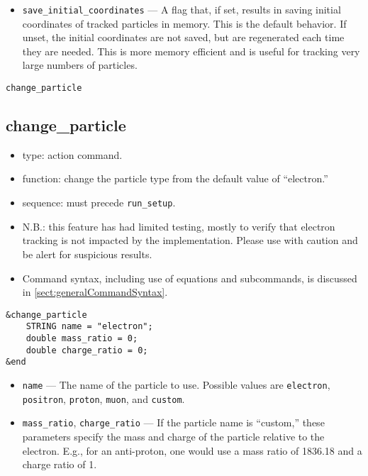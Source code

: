 \documentclass[11pt]{article}
\begin{document}
\begin{itemize}
\item \verb|save_initial_coordinates| --- A flag that, if set, results
in saving initial coordinates of tracked particles in memory.  This is
the default behavior.  If unset, the initial coordinates are not
saved, but are regenerated each time they are needed.  This is more
memory efficient and is useful for tracking very large numbers of
particles.
\end{itemize}

\newpage
\begin{center}{\Large\verb|change_particle|}\end{center}
\subsection{change\_particle\label{subsec:changeparticle}}

\begin{itemize}
\item type: action command.
\item function: change the particle type from the default value of ``electron.''
\item sequence: must precede \verb|run_setup|.
\item N.B.: this feature has had limited testing, mostly to verify that electron tracking is not
 impacted by the implementation.  Please use with caution and be alert for suspicious results.
\item Command syntax, including use of equations and subcommands, is discussed in \ref{sect:generalCommandSyntax}.
\end{itemize}

\begin{verbatim}
&change_particle
    STRING name = "electron";
    double mass_ratio = 0;
    double charge_ratio = 0;
&end
\end{verbatim}

\begin{itemize}
\item \verb|name| --- The name of the particle to use.  Possible values are \verb|electron|, \verb|positron|,
  \verb|proton|, \verb|muon|, and \verb|custom|.
\item \verb|mass_ratio|, \verb|charge_ratio| --- If the particle name is ``custom,'' these parameters specify the
  mass and charge of the particle relative to the electron.  E.g., for an anti-proton, one would use
  a mass ratio of 1836.18 and a charge ratio of 1.
\end{itemize}
\end{document}
